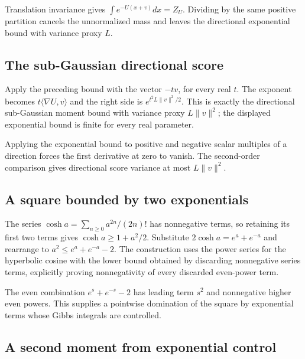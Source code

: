 \documentclass[11pt,a4paper]{report}
\begin{document}
Translation invariance gives \(\int e^{-U(x+v)}dx=Z_U\). Dividing by the same positive partition cancels the unnormalized mass and leaves the directional exponential bound with variance proxy \(L\).

\subsection{\texorpdfstring{The sub-Gaussian directional score}{The sub-Gaussian directional score}}
\label{report-step-UnadjustedLangevin-GibbsScore-lean-3}


Apply the preceding bound with the vector \(-tv\), for every real \(t\). The exponent becomes \(t\langle\nabla U,v\rangle\) and the right side is \(e^{t^2L\|v\|^2/2}\). This is exactly the directional sub-Gaussian moment bound with variance proxy \(L\|v\|^2\); the displayed exponential bound is finite for every real parameter.



Applying the exponential bound to positive and negative scalar multiples of a direction forces the first derivative at zero to vanish. The second-order comparison gives directional score variance at most \(L\|v\|^2\).

\subsection{\texorpdfstring{A square bounded by two exponentials}{A square bounded by two exponentials}}
\label{report-step-UnadjustedLangevin-GibbsScore-lean-4}


The series \(\cosh a=\sum_{n\ge0}a^{2n}/(2n)!\) has nonnegative terms, so retaining its first two terms gives \(\cosh a\ge1+a^2/2\). Substitute \(2\cosh a=e^a+e^{-a}\) and rearrange to \(a^2\le e^a+e^{-a}-2\). The construction uses the power series for the hyperbolic cosine with the lower bound obtained by discarding nonnegative series terms, explicitly proving nonnegativity of every discarded even-power term.



The even combination \(e^s+e^{-s}-2\) has leading term \(s^2\) and nonnegative higher even powers. This supplies a pointwise domination of the square by exponential terms whose Gibbs integrals are controlled.

\subsection{\texorpdfstring{A second moment from exponential control}{A second moment from exponential control}}
\label{report-step-UnadjustedLangevin-GibbsScore-lean-5}
\end{document}
